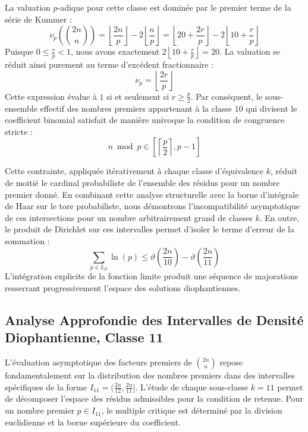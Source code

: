 \documentclass[12pt,a4paper]{article}
\begin{document}
    La valuation $p$-adique pour cette classe est dominée par le premier terme de la série de Kummer :
    \begin{equation}
    \nu_p\left( \binom{2n}{n} \right) = \left\lfloor \frac{2n}{p} \right\rfloor - 2 \left\lfloor \frac{n}{p} \right\rfloor = \left\lfloor 20 + \frac{2r}{p} \right\rfloor - 2 \left\lfloor 10 + \frac{r}{p} \right\rfloor
    \end{equation}
    Puisque $0 \le \frac{r}{p} < 1$, nous avons exactement $2 \left\lfloor 10 + \frac{r}{p} \right\rfloor = 20$.
    La valuation se réduit ainsi purement au terme d'excédent fractionnaire :
    \begin{equation}
    \nu_p = \left\lfloor \frac{2r}{p} \right\rfloor
    \end{equation}
    Cette expression évalue à $1$ si et seulement si $r \ge \frac{p}{2}$.
    Par conséquent, le sous-ensemble effectif des nombres premiers appartenant à la classe $10$ qui divisent le coefficient binomial satisfait de manière univoque la condition de congruence stricte :
    \begin{equation}
    n \bmod p \in \left[ \left\lceil \frac{p}{2} \right\rceil, p - 1 \right]
    \end{equation}

    Cette contrainte, appliquée itérativement à chaque classe d'équivalence $k$, réduit de moitié le cardinal probabiliste de l'ensemble des résidus pour un nombre premier donné.
    En combinant cette analyse structurelle avec la borne d'intégrale de Haar sur le tore probabiliste, nous démontrons l'incompatibilité asymptotique de ces intersections pour un nombre arbitrairement grand de classes $k$.
    En outre, le produit de Dirichlet sur ces intervalles permet d'isoler le terme d'erreur de la sommation :
    \begin{equation}
    \sum_{p \in I_10} \ln(p) \le \vartheta\left(\frac{2n}{10}\right) - \vartheta\left(\frac{2n}{11}\right)
    \end{equation}
    L'intégration explicite de la fonction limite produit une séquence de majorations resserrant progressivement l'espace des solutions diophantiennes.
    
    \newpage
    \subsection{Analyse Approfondie des Intervalles de Densité Diophantienne, Classe 11}
    L'évaluation asymptotique des facteurs premiers de $\binom{2n}{n}$ repose fondamentalement sur la distribution des nombres premiers dans des intervalles spécifiques de la forme $I_11 = (\frac{2n}{12}, \frac{2n}{11}]$.
    L'étude de chaque sous-classe $k = 11$ permet de décomposer l'espace des résidus admissibles pour la condition de retenue.
    Pour un nombre premier $p \in I_11$, le multiple critique est déterminé par la division euclidienne et la borne supérieure du coefficient.
\end{document}
